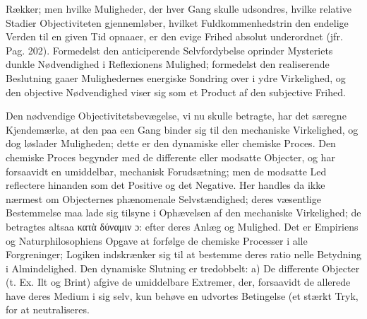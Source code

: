 \documentclass[12pt]{book}
\newcommand{\dsi}{\textup{ɔ:}}
\newcommand{\opage}[1]{\marginnote{\footnotesize\textit{[#1]}}}
\begin{document}
Rækker; men hvilke Muligheder, der hver Gang skulle udsondres, hvilke relative Stadier
Objectiviteten gjennemløber, hvilket Fuldkommenhedstrin den endelige Verden til en given Tid
opnaaer, er den evige Frihed absolut underordnet (jfr. Pag. 202).
Formedelst den anticiperende Selvfordybelse oprinder Mysteriets dunkle Nødvendighed i
Reflexionens Mulighed; formedelst den realiserende Beslutning gaaer Mulighedernes energiske
Sondring over i ydre Virkelighed, og den objective Nødvendighed viser sig som et Product af
den subjective Frihed.

Den nødvendige Objectivitetsbevægelse, vi nu skulle betragte, har det særegne Kjendemærke,
at den paa een Gang binder sig til den mechaniske Virkelighed, og dog løslader Muligheden;
dette er den dynamiske eller chemiske Proces. Den chemiske Proces begynder med de differente
eller modsatte Objecter, og har forsaavidt en umiddelbar, mechanisk Forudsætning; men de
modsatte Led reflectere hinanden som det Positive og det Negative. Her handles da ikke
nærmest om Objecternes phænomenale Selvstændighed; deres væsentlige Bestemmelse maa lade sig
tilsyne i Ophævelsen af den mechaniske Virkelighed; de betragtes altsaa κατὰ δύναμιν \dsi{}
efter deres Anlæg og Mulighed.
Det er Empiriens og Naturphilosophiens Opgave at forfølge de chemiske Processer i alle
Forgreninger; Logiken indskrænker sig til at bestemme deres ratio
\opage{218} nelle Betydning i Almindelighed. Den dynamiske Slutning er tredobbelt: a) De differente
Objecter (t. Ex. Ilt og Brint) afgive de umiddelbare Extremer, der, forsaavidt de allerede
have deres Medium i sig selv, kun behøve en udvortes Betingelse (et stærkt Tryk, for at
neutraliseres.
\end{document}
